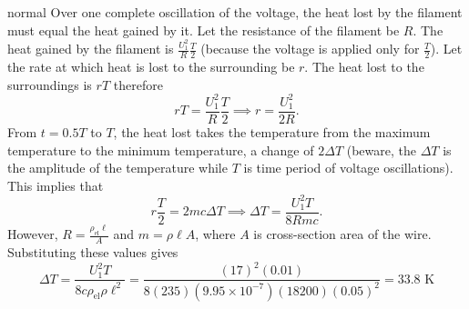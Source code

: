 \begin{solution}{normal}
Over one complete oscillation of the voltage, the heat lost by the filament must equal the heat gained by it. Let the resistance of the filament be $R$. The heat gained by the filament is $\frac{U_1^2}{R}\frac{T}{2}$ (because the voltage is applied only for $\frac{T}{2}$). Let the rate at which heat is lost to the surrounding be $r$. The heat lost to the surroundings is $rT$ therefore 
$$rT = \frac{U_1^2}{R}\frac{T}{2} \implies r  =\frac{U_1^2}{2R}.$$
From $t = 0.5T$ to $T$, the heat lost takes the temperature from the maximum temperature to the minimum temperature, a change of $2 \Delta T$ (beware, the $\Delta T$ is the amplitude of the temperature while $T$ is time period of voltage oscillations). This implies that 
\[r\frac{T}{2} = 2mc \Delta T \implies \Delta T = \frac{U_1^2 T}{8Rmc}.\]
However, $R = \frac{\rho_{\text{el}}\ell}{A}$ and $m = \rho \ell A$, where $A$ is cross-section area of the wire. Substituting these values gives 
\[\Delta T = \frac{U_1^2 T}{8c \rho_{\text{el}} \rho \ell^2} = \frac{(17)^2(0.01)}{8(235)(9.95\times 10^{-7})(18200)(0.05)^2}=\boxed{33.8 \text{ K}}\]
\end{solution}